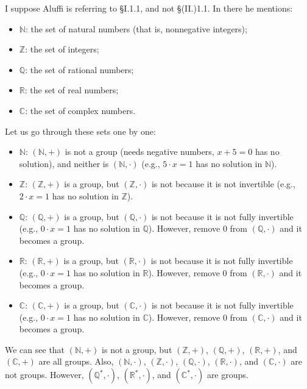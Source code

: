 I suppose Aluffi is referring to §I.1.1, and not §(II.)1.1. In there he mentions:

\begin{itemize}
	\item $\mathbb{N}$: the set of natural numbers (that is, nonnegative integers);
	\item $\mathbb{Z}$: the set of integers;
	\item $\mathbb{Q}$: the set of rational numbers;
	\item $\mathbb{R}$: the set of real numbers;
	\item $\mathbb{C}$: the set of complex numbers.
\end{itemize}

Let us go through these sets one by one:

\begin{itemize}
	\item $\mathbb{N}$: $(\mathbb{N}, +)$ is not a group (needs negative numbers, $x + 5 = 0$ has no solution), and neither is $(\mathbb{N}, \cdot)$ (e.g., $5 \cdot x = 1$ has no solution in $\mathbb{N}$).
	\item $\mathbb{Z}$: $(\mathbb{Z}, +)$ is a group, but $(\mathbb{Z}, \cdot)$ is not because it is not invertible (e.g., $2 \cdot x = 1$ has no solution in $\mathbb{Z}$).
	\item $\mathbb{Q}$: $(\mathbb{Q}, +)$ is a group, but $(\mathbb{Q}, \cdot)$ is not because it is not fully invertible (e.g., $0 \cdot x = 1$ has no solution in $\mathbb{Q}$). However, remove $0$ from $(\mathbb{Q}, \cdot)$ and it becomes a group.
	\item $\mathbb{R}$: $(\mathbb{R}, +)$ is a group, but $(\mathbb{R}, \cdot)$ is not because it is not fully invertible (e.g., $0 \cdot x = 1$ has no solution in $\mathbb{R}$). However, remove $0$ from $(\mathbb{R}, \cdot)$ and it becomes a group.
	\item $\mathbb{C}$: $(\mathbb{C}, +)$ is a group, but $(\mathbb{C}, \cdot)$ is not because it is not fully invertible (e.g., $0 \cdot x = 1$ has no solution in $\mathbb{C}$). However, remove $0$ from $(\mathbb{C}, \cdot)$ and it becomes a group.
\end{itemize}

We can see that $(\mathbb{N}, +)$ is not a group, but $(\mathbb{Z}, +)$, $(\mathbb{Q}, +)$, $(\mathbb{R}, +)$, and $(\mathbb{C}, +)$ are all groups. Also, $(\mathbb{N}, \cdot)$, $(\mathbb{Z}, \cdot)$, $(\mathbb{Q}, \cdot)$, $(\mathbb{R}, \cdot)$, and $(\mathbb{C}, \cdot)$ are not groups. However, $(\mathbb{Q}^*, \cdot)$, $(\mathbb{R}^*, \cdot)$, and $(\mathbb{C}^*, \cdot)$ are groups.



